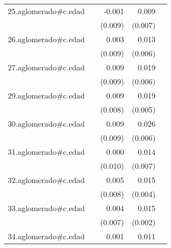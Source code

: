{\begin{longtable}{l*{4}{D{.}{.}{-1}}}
\addlinespace
25.aglomerado#c.edad&                     &      -0.001         &       0.009         &                     \\
            &                     &     (0.009)         &     (0.007)         &                     \\
\addlinespace
26.aglomerado#c.edad&                     &       0.003         &       0.013\sym{*}  &                     \\
            &                     &     (0.009)         &     (0.006)         &                     \\
\addlinespace
27.aglomerado#c.edad&                     &       0.009         &       0.019\sym{**} &                     \\
            &                     &     (0.009)         &     (0.006)         &                     \\
\addlinespace
29.aglomerado#c.edad&                     &       0.009         &       0.019\sym{***}&                     \\
            &                     &     (0.008)         &     (0.005)         &                     \\
\addlinespace
30.aglomerado#c.edad&                     &       0.009         &       0.026\sym{***}&                     \\
            &                     &     (0.009)         &     (0.006)         &                     \\
\addlinespace
31.aglomerado#c.edad&                     &       0.000         &       0.014         &                     \\
            &                     &     (0.010)         &     (0.007)         &                     \\
\addlinespace
32.aglomerado#c.edad&                     &       0.005         &       0.015\sym{***}&                     \\
            &                     &     (0.008)         &     (0.004)         &                     \\
\addlinespace
33.aglomerado#c.edad&                     &       0.004         &       0.015\sym{***}&                     \\
            &                     &     (0.007)         &     (0.002)         &                     \\
\addlinespace
34.aglomerado#c.edad&                     &       0.001         &       0.011         &                     \\

\end{longtable}}
